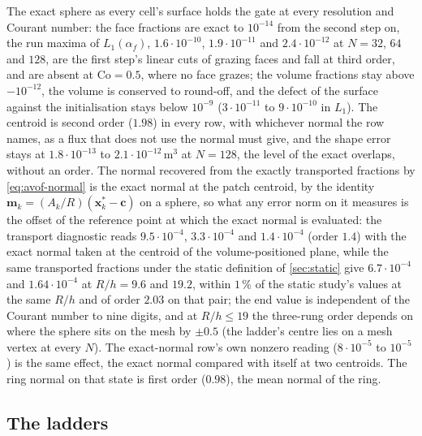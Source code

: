 \documentclass[preprint,12pt]{elsarticle}
\begin{document}
The exact sphere as every cell's surface holds the gate at every resolution and Courant number: the face fractions are exact to $10^{-14}$ from the second step on, the run maxima of $L_1(\alpha_f)$, $1.6\cdot10^{-10}$, $1.9\cdot10^{-11}$ and $2.4\cdot10^{-12}$ at $N = 32$, $64$ and $128$, are the first step's linear cuts of grazing faces and fall at third order, and are absent at $\mathrm{Co} = 0.5$, where no face grazes; the volume fractions stay above $-10^{-12}$, the volume is conserved to round-off, and the defect of the surface against the initialisation stays below $10^{-9}$ ($3\cdot10^{-11}$ to $9\cdot10^{-10}$ in $L_1$). The centroid is second order ($1.98$) in every row, with whichever normal the row names, as a flux that does not use the normal must give, and the shape error stays at $1.8\cdot10^{-13}$ to $2.1\cdot10^{-12}\,\mathrm{m^3}$ at $N = 128$, the level of the exact overlaps, without an order. The normal recovered from the exactly transported fractions by \cref{eq:avof-normal} is the exact normal at the patch centroid, by the identity $\mathbf{m}_k = (A_k/R)(\mathbf{x}^*_k - \mathbf{c})$ on a sphere, so what any error norm on it measures is the offset of the reference point at which the exact normal is evaluated: the transport diagnostic reads $9.5\cdot10^{-4}$, $3.3\cdot10^{-4}$ and $1.4\cdot10^{-4}$ (order $1.4$) with the exact normal taken at the centroid of the volume-positioned plane, while the same transported fractions under the static definition of \cref{sec:static} give $6.7\cdot10^{-4}$ and $1.64\cdot10^{-4}$ at $R/h = 9.6$ and $19.2$, within $1\,\%$ of the static study's values at the same $R/h$ and of order $2.03$ on that pair; the end value is independent of the Courant number to nine digits, and at $R/h \le 19$ the three-rung order depends on where the sphere sits on the mesh by $\pm 0.5$ (the ladder's centre lies on a mesh vertex at every $N$). The exact-normal row's own nonzero reading ($8\cdot10^{-5}$ to $10^{-5}$) is the same effect, the exact normal compared with itself at two centroids. The ring normal on that state is first order ($0.98$), the mean normal of the ring.

\subsection{The ladders}
\label{app:tpf-ladders}
\end{document}
